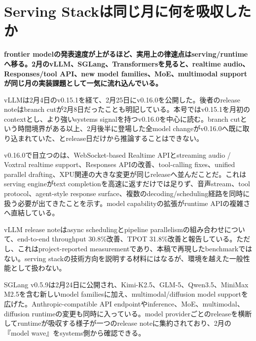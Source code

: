 \section{Serving Stackは同じ月に何を吸収したか}
\label{pkg:serving-stack-catches-up}
\noindent\textbf{frontier modelの発表速度が上がるほど、実用上の律速点はserving/runtimeへ移る。2月のvLLM、SGLang、Transformersを見ると、realtime audio、Responses/tool API、new model families、MoE、multimodal supportが同じ月の実装課題として一気に流れ込んでいる。}\autocite{src-5041feb6f87f,src-5bc0746a47c6,src-a43d64987293}

vLLMは2月4日のv0.15.1を経て、2月25日にv0.16.0を公開した。後者のrelease noteはbranch cutが2月8日だったことも明記している。本号ではv0.15.1を月初のcontextとし、より強いsystems signalを持つv0.16.0を中心に読む。branch cutという時間境界がある以上、2月後半に登場した全model changeがv0.16.0へ既に取り込まれていた、とrelease日だけから推論することはできない。\autocite{src-5041feb6f87f,src-67307025f5d9}


v0.16.0で目立つのは、WebSocket-based Realtime APIとstreaming audio / Voxtral realtime support、Responses APIの改善、tool-calling fixes、unified parallel drafting、XPU関連の大きな変更が同じreleaseへ並んだことだ。これはserving engineがtext completionを高速に返すだけでは足りず、音声stream、tool protocol、agent-style response surface、複数のdecoding/scheduling経路を同時に扱う必要が出てきたことを示す。model capabilityの拡張がruntime APIの複雑さへ直結している。\autocite{src-5041feb6f87f}


\begin{claimboundary}
vLLM release noteはasync schedulingとpipeline parallelismの組み合わせについて、end-to-end throughput 30.8\%改善、TPOT 31.8\%改善と報告している。ただし、これはproject-reported measurementであり、本稿で再現したbenchmarkではない。serving stackの技術方向を説明する材料にはなるが、環境を越えた一般性能として扱わない。\autocite{src-5041feb6f87f,src-67307025f5d9}
\end{claimboundary}

SGLang v0.5.9は2月24日に公開され、Kimi-K2.5、GLM-5、Qwen3.5、MiniMax M2.5を含む新しいmodel familiesに加え、multimodal/diffusion model supportを広げた。Anthropic-compatible API endpointやinference、MoE、multimodal、diffusion runtimeの変更も同時に入っている。model providerごとのreleaseを横断してruntimeが吸収する様子が一つのrelease noteに集約されており、2月の『model wave』をsystems側から確認できる。\autocite{src-5bc0746a47c6}


